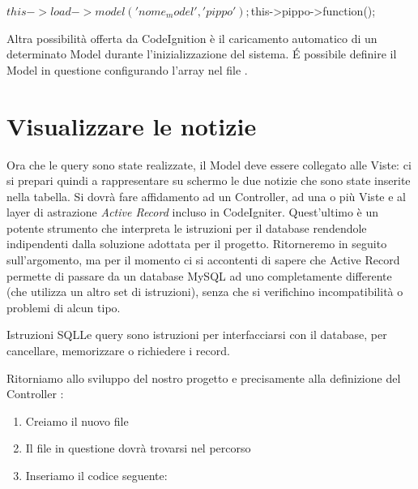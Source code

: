 \begin{code}
$this->load->model('nome_model', 'pippo');

$this->pippo->function();
\end{code}

Altra possibilità offerta da CodeIgnition è il caricamento automatico di un determinato Model durante l'inizializzazione del sistema. \'E possibile definire il Model in questione configurando l'array  nel file .

\section*{Visualizzare le notizie}
Ora che le query sono state realizzate, il Model deve essere collegato alle Viste: ci si prepari quindi a rappresentare su schermo le due notizie che sono state inserite nella tabella. Si dovrà fare affidamento ad un Controller, ad una o più Viste e al layer di astrazione \emph{Active Record} incluso in CodeIgniter. Quest'ultimo è un potente strumento che interpreta le istruzioni per il database rendendole indipendenti dalla soluzione adottata per il progetto. Ritorneremo in seguito sull'argomento, ma per il momento ci si accontenti di sapere che Active Record permette di passare da un database MySQL ad uno completamente differente (che utilizza un altro set di istruzioni), senza che si verifichino incompatibilità o problemi di alcun tipo.

\begin{deftab}{Istruzioni SQL}{Le query sono istruzioni per interfacciarsi con il database, per cancellare, memorizzare o richiedere i record.}
\end{deftab}

Ritorniamo allo sviluppo del nostro progetto e precisamente alla definizione del Controller :

\begin{enumerate}
\item Creiamo il nuovo file  
\item Il file in questione dovrà trovarsi nel percorso 
\item Inseriamo il codice seguente:
\end{enumerate}

\label{list:classnews}

